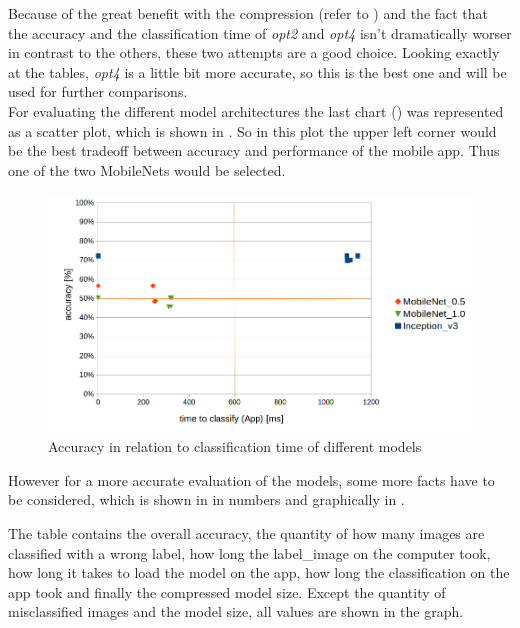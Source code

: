 Because of the great benefit with the compression (refer to ) and the fact that the accuracy and the classification time of \textit{opt2} and \textit{opt4} isn't dramatically worser in contrast to the others, these two attempts are a good choice. Looking exactly at the tables, \textit{opt4} is a little bit more accurate, so this is the best one and will be used for further comparisons. \\

For evaluating the different model architectures the last chart () was represented as a scatter plot, which is shown in . So in this plot the upper left corner would be the best tradeoff between accuracy and performance of the mobile app. Thus one of the two MobileNets would be selected. \\

\begin{figure}[htbp]
\centering
\includegraphics[width=\textwidth]{includes/evalAccTime}
\caption[evalAccTime2]{Accuracy in relation to classification time of different models}
\label{fig:evalAccTime}
\end{figure}




However for a more accurate evaluation of the models, some more facts have to be considered, which is shown in  in numbers and graphically in .

The table contains the overall accuracy, the quantity of how many images are classified with a wrong label, how long the label_image on the computer took, how long it takes to load the model on the app, how long the classification on the app took and finally the compressed model size. Except the quantity of misclassified images and the model size, all values are shown in the graph. \\

